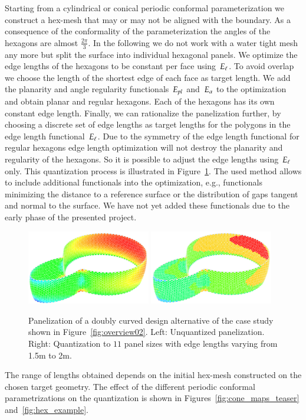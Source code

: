 \documentclass[article.tex]{subfiles}
\begin{document}
Starting from a cylindrical or conical periodic conformal
parameterization we construct a hex-mesh that may or may not be
aligned with the boundary. As a consequence of the conformality of the
parameterization the angles of the hexagons are almost
$\tfrac{2\pi}{3}$. In the following we do not work with a water tight
mesh any more but split the surface into individual hexagonal
panels. We optimize the edge lengths of the hexagons to be constant
per face using~$E_\ell$. To avoid overlap we choose the length of the
shortest edge of each face as target length. We add the planarity and
angle regularity functionals~$E_{pl}$ and~$E_\alpha$ to the optimization
and obtain planar and regular hexagons. Each of the hexagons has its
own constant edge length. Finally, we can rationalize the panelization
further, by choosing a discrete set of edge lengths as target lengths
for the polygons in the edge length functional~$E_\ell$. Due to the
symmetry of the edge length functional for regular hexagons edge
length optimization will not destroy the planarity and regularity of
the hexagons. So it is possible to adjust the edge lengths
using~$E_\ell$ only. This quantization process is illustrated in
Figure~\ref{fig:quantization}.
%
The used method allows to include additional functionals into the
optimization, e.g., functionals minimizing the distance to a reference
surface or the distribution of gaps tangent and normal to the
surface. We have not yet added these functionals due to the early
phase of the presented project.


\begin{figure}[tbp]
  \centering
  \includegraphics[width=0.48\textwidth]{images/wanda_curved_unquantized.png}
  \includegraphics[width=0.48\textwidth]{images/wanda_curved_quantized.png}
  \caption{Panelization of a doubly curved design alternative of the
    case study shown in Figure~\ref{fig:overview02}. Left: Unquantized
    panelization.  Right: Quantization to $11$ panel sizes with edge
    lengths varying from 1.5m to 2m.}
  \label{fig:quantization}
\end{figure}

The range of lengths obtained depends on the initial hex-mesh
constructed on the chosen target geometry. The effect of the
different periodic conformal parametrizations on the quantization is
shown in Figures~\ref{fig:cone_maps_teaser} and~\ref{fig:hex_example}.
\end{document}
